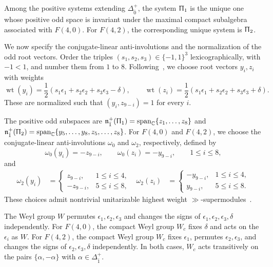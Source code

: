 \begin{lemma}
\label{lemm::F4_compact_invariance}
Among the positive systems extending $\Delta_{\bar0}^+$,
the system $\Uppi_1$ is the unique one whose positive odd
space is invariant under the maximal compact subalgebra
associated with $F(4,0)$. For $F(4,2)$, the corresponding
unique system is $\Uppi_2$.
\end{lemma}

We now specify the conjugate-linear anti-involutions and the normalization
of the odd root vectors. Order the triples
$(s_1,s_2,s_3)\in\{-1,1\}^3$ lexicographically, with
$-1<1$, and number them from $1$ to $8$.
Following~\cite{jakobsen1994full}, we choose root vectors $y_i,z_i$ with weights
\begin{equation}
\operatorname{wt}(y_i)
=
\frac12(s_1\epsilon_1+s_2\epsilon_2+s_3\epsilon_3-\delta),
\qquad
\operatorname{wt}(z_i)
=
\frac12(s_1\epsilon_1+s_2\epsilon_2+s_3\epsilon_3+\delta).
\end{equation}
These are normalized such that 
$(y_i,z_{9-i})=1$ for every $i$.


The positive odd subspaces are ${\mathfrak{n}}_{\bar1}^+(\Uppi_1)=\operatorname{span}_{{\mathbb C}}\{z_1,\ldots,z_8\}$ and ${\mathfrak{n}}_{\bar1}^+(\Uppi_2)=\operatorname{span}_{{\mathbb C}}\{y_5,\ldots,y_8,z_5,\ldots,z_8\}$. For $F(4,0)$ and $F(4,2)$, we choose the conjugate-linear anti-involutions $\omega_0$ and $\omega_2$, respectively, defined by
\begin{equation}\label{eq::F4_omega0}
\omega_0(y_i)=-z_{9-i},
\qquad
\omega_0(z_i)=-y_{9-i},
\qquad 1\leq i\leq8,
\end{equation}
and
\begin{equation}\label{eq::F4_omega2}
\begin{aligned}
\omega_2(y_i)
&=
\begin{cases}
z_{9-i},&1\leq i\leq4,\\
-z_{9-i},&5\leq i\leq8,
\end{cases}
&
\omega_2(z_i)
&=
\begin{cases}
-y_{9-i},&1\leq i\leq4,\\
y_{9-i},&5\leq i\leq8.
\end{cases}
\end{aligned}
\end{equation}
These choices admit nontrivial unitarizable highest weight $\gg$-supermodules~\cite{jakobsen1994full}.


The Weyl group $W$ permutes $\epsilon_1,\epsilon_2,\epsilon_3$ and changes the signs of $\epsilon_1,\epsilon_2,\epsilon_3,\delta$ independently. For $F(4,0)$, the compact Weyl group $W_c$ fixes $\delta$ and acts on the $\epsilon_i$ as $W$. For $F(4,2)$, the compact Weyl group $W_c$ fixes $\epsilon_1$, permutes $\epsilon_2,\epsilon_3$, and changes the signs of $\epsilon_2,\epsilon_3,\delta$ independently.
In both cases, $W_c$ acts transitively on the pairs $\{\alpha,-\alpha\}$ with $\alpha\in\Delta_{\bar{1}}^{+}$.


